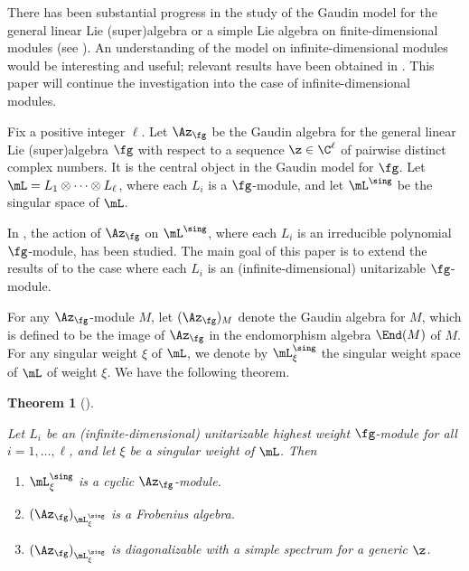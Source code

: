 \documentclass[11pt, reqno]{amsart}
\newtheorem{thm}{Theorem}[section]
\theoremstyle{definition}
\theoremstyle{remark}
\numberwithin{equation}{section}
\begin{document}
There has been substantial progress in the study of the Gaudin model for the general linear Lie (super)algebra or a simple Lie algebra on finite-dimensional modules (see \cite{ChL25, FFRyb, HM, MTV06, MTV09-1, MTV09-2, MVY, Ry20}).
An understanding of the model on infinite-dimensional modules would be interesting and useful; relevant results have been obtained in \cite{CCL, ChL24, ChL26-1, ChL26-2}.
This paper will continue the investigation into the case of infinite-dimensional modules.

Fix a positive integer $\ell$.
Let $\Az_\fg$ be the Gaudin algebra for the general linear Lie (super)algebra $\fg$ with respect to a sequence $\z \in \C^\ell$ of pairwise distinct complex numbers.
It is the central object in the Gaudin model for $\fg$.
Let $\mL=L_1 \otimes \cdots \otimes  L_\ell$, where each $L_i$ is a $\fg$-module, and let $\mL^\sing$ be the singular space of $\mL$.

In \cite{ChL25}, the action of $\Az_\fg$ on $\mL^\sing$, where each $L_i$ is an irreducible polynomial $\fg$-module, has been studied.
The main goal of this paper is to extend the results of \cite{ChL25} to the case where each $L_i$ is an (infinite-dimensional) unitarizable $\fg$-module.


For any $\Az_\fg$-module $M$, let $(\Az_\fg)_M$ denote the Gaudin algebra for $M$, which is defined to be the image of $\Az_\fg$ in the endomorphism algebra $\End(M)$ of $M$.
For any singular weight $\xi$ of $\mL$, we denote by $\mL^\sing_\xi$ the singular weight space of $\mL$ of weight $\xi$.
We have the following theorem.

\begin{thm} [] \label{main1}

Let $L_i$ be an (infinite-dimensional) unitarizable highest weight $\fg$-module for all $i=1, \ldots, \ell$, and let $\xi$ be a singular weight of $\mL$. Then

\begin{enumerate}[\normalfont(i)]

\item $\mL^\sing_\xi$ is a cyclic $\Az_\fg$-module.
\item  $(\Az_\fg)_{\mL^\sing_\xi}$ is a Frobenius algebra.
\item  $(\Az_\fg)_{\mL^\sing_\xi}$ is diagonalizable with a simple spectrum for a generic $\z$.

\end{enumerate}
\end{thm}
\end{document}
